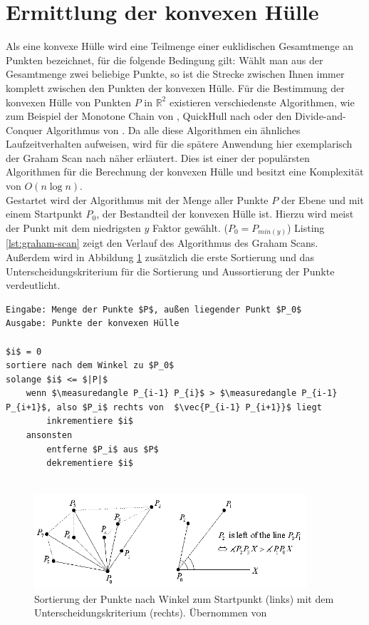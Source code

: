 \section{Ermittlung der konvexen Hülle}

Als eine konvexe Hülle wird eine Teilmenge einer euklidischen Gesamtmenge an Punkten bezeichnet, für die folgende Bedingung gilt: Wählt man aus der Gesamtmenge zwei beliebige Punkte, so ist die Strecke zwischen Ihnen immer komplett zwischen den Punkten der konvexen Hülle. Für die Bestimmung der konvexen Hülle von Punkten \(P\) in \( \mathbb{R}^2\) existieren verschiedenste Algorithmen, wie zum Beispiel der Monotone Chain von \citet{andrew1979another}, QuickHull nach \citet{eddy1977new} oder den Divide-and-Conquer Algorithmus von \citet{preparata1985convex}. Da alle diese Algorithmen ein ähnliches Laufzeitverhalten aufweisen, wird für die spätere Anwendung hier exemplarisch der Graham Scan nach \citet{graham1972efficient} näher erläutert. Dies ist einer der populärsten Algorithmen für die Berechnung der konvexen Hülle und besitzt eine Komplexität von \(O(n \log n)\).\\

Gestartet wird der Algorithmus mit der Menge aller Punkte \(P\) der Ebene und mit einem Startpunkt \(P_0\), der Bestandteil der konvexen Hülle ist. Hierzu wird meist der Punkt mit dem niedrigsten \(y\) Faktor gewählt. (\(P_0=P_{min(y)}\)) Listing \ref{lst:graham-scan} zeigt den Verlauf des Algorithmus des Graham Scans. Außerdem wird in Abbildung \ref{fig:convexhull} zusätzlich die erste Sortierung und das Unterscheidungskriterium für die Sortierung und Aussortierung der Punkte verdeutlicht. \citep{convexHull} \\


\begin{lstlisting}[mathescape,caption=Graham Scan Algorithmus, label=lst:graham-scan, float=htbp]
Eingabe: Menge der Punkte $P$, außen liegender Punkt $P_0$
Ausgabe: Punkte der konvexen Hülle

$i$ = 0
sortiere nach dem Winkel zu $P_0$
solange $i$ <= $|P|$
    wenn $\measuredangle P_{i-1} P_{i}$ > $\measuredangle P_{i-1} P_{i+1}$, also $P_i$ rechts von  $\vec{P_{i-1} P_{i+1}}$ liegt
        inkrementiere $i$
    ansonsten
        entferne $P_i$ aus $P$
        dekrementiere $i$
    
\end{lstlisting} 

\begin{figure}[h]
  \centering
	\includegraphics[width=0.9\textwidth]{content/images/methods/convexhull.png} 
  \caption{Sortierung der Punkte nach Winkel zum Startpunkt (links) mit dem Unterscheidungskriterium (rechts). Übernommen von \citet{convexHull}}
  \label{fig:convexhull}
\end{figure}

